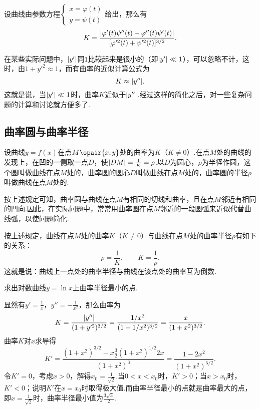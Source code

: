 设曲线由参数方程\(\left\{ \begin{array}{c} x = \varphi(t) \\ y = \psi(t) \end{array} \right.\)给出，那么有\begin{equation}
K = \frac{\abs{\varphi'(t)\psi''(t)-\varphi''(t)\psi'(t)}}{[\varphi'^2(t)+\psi'^2(t)]^{3/2}}.
\end{equation}

在某些实际问题中，\(\abs{y'}\)同\(1\)比较起来是很小的（即\(\abs{y'} \ll 1\)），可以忽略不计，这时，由\(1 + y'^2 \approx 1\)，而有曲率的近似计算公式为\[
K \approx \abs{y''}.
\]这就是说，当\(\abs{y'} \ll 1\)时，曲率\(K\)近似于\(\abs{y''}\).经过这样的简化之后，对一些复杂问题的计算和讨论就方便多了.

\subsection{曲率圆与曲率半径}
设曲线\(y=f(x)\)在点\(M\opair{x,y}\)处的曲率为\(K\)（\(K\neq0\)）.在点\(M\)处的曲线的发现上，在凹的一侧取一点\(D\)，使\(\abs{DM} = \frac{1}{K} = \rho\).以\(D\)为圆心，\(\rho\)为半径作圆，这个圆叫做曲线在点\(M\)处的，曲率圆的圆心\(D\)叫做曲线在点\(M\)处的，曲率圆的半径\(\rho\)叫做曲线在点\(M\)处的.

按上述规定可知，曲率圆与曲线在点\(M\)有相同的切线和曲率，且在点\(M\)邻近有相同的凹向.因此，在实际问题中，常常用曲率圆在点\(M\)邻近的一段圆弧来近似代替曲线弧，以使问题简化.

按上述规定，曲线在点\(M\)处的曲率\(K\)（\(K\neq0\)）与曲线在点\(M\)处的曲率半径\(\rho\)有如下的关系：\[
\rho = \frac{1}{K}, \qquad K = \frac{1}{\rho}.
\]这就是说：曲线上一点处的曲率半径与曲线在该点处的曲率互为倒数.

\begin{example}
求出对数曲线\(y = \ln x\)上曲率半径最小的点.
\begin{solution}
显然有\(y' = \frac{1}{x}\)，\(y'' = -\frac{1}{x^2}\)，那么曲率为\[
K = \frac{\abs{y''}}{(1+y'^2)^{3/2}}
= \frac{1/x^2}{(1+1/x^2)^{3/2}}
= \frac{x}{(1+x^2)^{3/2}}.
\]曲率\(K\)对\(x\)求导得\[
K' = \frac{(1+x^2)^{3/2} - x \frac{3}{2} (1+x^2)^{1/2} 2x}{(1+x^2)^3}
= \frac{1 - 2x^2}{(1+x^2)^{5/2}}.
\]令\(K' = 0\)，考虑\(x>0\)，解得\(x_0 = \frac{1}{\sqrt{2}}\).当\(0<x<x_0\)时，\(K'>0\)；当\(x>x_0\)时，\(K'<0\)；说明\(K'\)在\(x=x_0\)时取得极大值.而曲率半径最小的点就是曲率最大的点，即\(x = \frac{1}{\sqrt{2}}\)时，曲率半径最小值为\(\frac{3\sqrt{3}}{2}\).
\end{solution}
\end{example}

